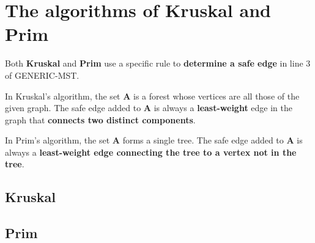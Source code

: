 \section {The algorithms of Kruskal and Prim}

Both \textbf{Kruskal} and \textbf{Prim} use a specific rule to \textbf{determine
  a safe edge} in line 3 of GENERIC-MST.

In Kruskal's algorithm, the set \textbf{A} is a forest whose vertices are all
those of the given graph. The safe edge added to \textbf{A} is always a
\textbf{least-weight} edge in the graph that \textbf{connects two distinct
  components}.

In Prim's algorithm, the set \textbf{A} forms a single tree. The safe edge added
to \textbf{A} is always a \textbf{least-weight edge connecting the tree to a
  vertex not in the tree}.

\subsection {Kruskal}




\subsection {Prim}
